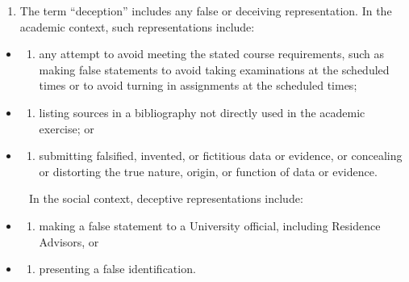 \documentclass[
]{book}
\providecommand{\tightlist}{%
  \setlength{\itemsep}{0pt}\setlength{\parskip}{0pt}}
\begin{document}
\begin{enumerate}
\def\labelenumi{\arabic{enumi}.}
\setcounter{enumi}{3}
\tightlist
\item
  The term ``deception'' includes any false or deceiving representation. In the academic context, such representations include:
\end{enumerate}

\begin{itemize}
\tightlist
\item
  \begin{enumerate}
  \def\labelenumi{(\alph{enumi})}
  \tightlist
  \item
    any attempt to avoid meeting the stated course requirements, such as making false statements to avoid taking examinations at the scheduled times or to avoid turning in assignments at the scheduled times;
  \end{enumerate}
\item
  \begin{enumerate}
  \def\labelenumi{(\alph{enumi})}
  \setcounter{enumi}{1}
  \tightlist
  \item
    listing sources in a bibliography not directly used in the academic exercise; or
  \end{enumerate}
\item
  \begin{enumerate}
  \def\labelenumi{(\alph{enumi})}
  \setcounter{enumi}{2}
  \tightlist
  \item
    submitting falsified, invented, or fictitious data or evidence, or concealing or distorting the true nature, origin, or function of data or evidence.
  \end{enumerate}
\end{itemize}

~~~~~In the social context, deceptive representations include:

\begin{itemize}
\tightlist
\item
  \begin{enumerate}
  \def\labelenumi{(\alph{enumi})}
  \tightlist
  \item
    making a false statement to a University official, including Residence Advisors, or
  \end{enumerate}
\item
  \begin{enumerate}
  \def\labelenumi{(\alph{enumi})}
  \setcounter{enumi}{1}
  \tightlist
  \item
    presenting a false identification.
  \end{enumerate}
\end{itemize}
\end{document}
